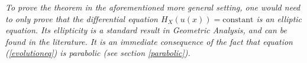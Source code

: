 \begin{oss}
	\em To prove the theorem in the aforementioned more general setting, one would need to only prove that the differential equation $H_X(u(x))= \mathrm{constant}$ is an elliptic equation. Its ellipticity is a standard result in Geometric Analysis, and can be found in the literature. It is an immediate consequence of the fact that equation (\ref{evolutioneq}) is parabolic (see section \ref{parabolic}).
\end{oss}